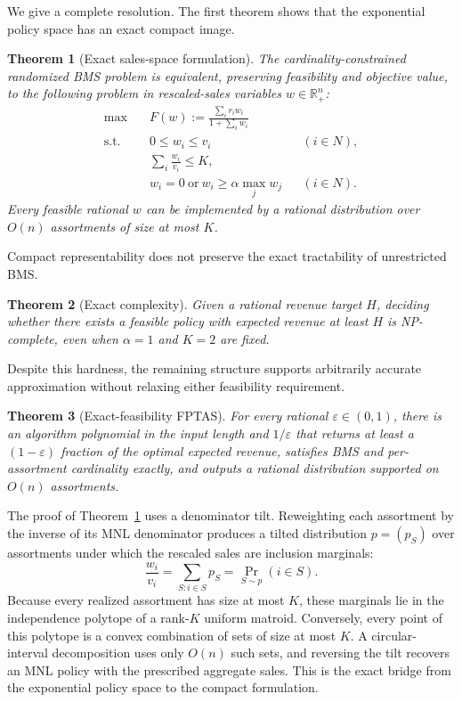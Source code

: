 \documentclass[11pt]{article}
\newtheorem{theorem}{Theorem}
\begin{document}
We give a complete resolution.  The first theorem shows that the exponential policy space has an exact compact image.

\begin{theorem}[Exact sales-space formulation]\label{thm:sales}
The cardinality-constrained randomized BMS problem is equivalent, preserving feasibility and objective value, to the following problem in rescaled-sales variables $w\in\mathbb R_+^n$:
\begin{align}
 \max\quad &F(w):=\frac{\sum_i r_iw_i}{1+\sum_iw_i} \label{eq:obj}\\
 \text{s.t.}\quad &0\le w_i\le v_i &&(i\in N),\label{eq:caps}\\
 &\sum_i\frac{w_i}{v_i}\le K,\label{eq:rank}\\
 &w_i=0\ \text{or}\ w_i\ge\alpha\max_jw_j &&(i\in N).\label{eq:bmsw}
\end{align}
Every feasible rational $w$ can be implemented by a rational distribution over $O(n)$ assortments of size at most $K$.
\end{theorem}

Compact representability does not preserve the exact tractability of unrestricted BMS.

\begin{theorem}[Exact complexity]\label{thm:hardness}
Given a rational revenue target $H$, deciding whether there exists a feasible policy with expected revenue at least $H$ is NP-complete, even when $\alpha=1$ and $K=2$ are fixed.
\end{theorem}

Despite this hardness, the remaining structure supports arbitrarily accurate approximation without relaxing either feasibility requirement.

\begin{theorem}[Exact-feasibility FPTAS]\label{thm:fptas}
For every rational $\varepsilon\in(0,1)$, there is an algorithm polynomial in the input length and $1/\varepsilon$ that returns at least a $(1-\varepsilon)$ fraction of the optimal expected revenue, satisfies BMS and per-assortment cardinality exactly, and outputs a rational distribution supported on $O(n)$ assortments.
\end{theorem}

The proof of Theorem~\ref{thm:sales} uses a denominator tilt. Reweighting each assortment by the inverse of its MNL denominator produces a tilted distribution $p=(p_S)$ over assortments under which the rescaled sales are inclusion marginals:
\[
 \frac{w_i}{v_i}=\sum_{S:i\in S}p_S=\Pr_{S\sim p}(i\in S).
\]
Because every realized assortment has size at most $K$, these marginals lie in the independence polytope of a rank-$K$ uniform matroid. Conversely, every point of this polytope is a convex combination of sets of size at most $K$. A circular-interval decomposition uses only $O(n)$ such sets, and reversing the tilt recovers an MNL policy with the prescribed aggregate sales. This is the exact bridge from the exponential policy space to the compact formulation.
\end{document}
